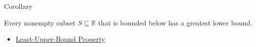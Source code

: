 \begin{corollarybox}{Corollary}
\begin{corollary}
\label{cor:glb-property-r}
Every nonempty subset $S\subseteq\mathbb{R}$ that is bounded below has a
greatest lower bound.
\end{corollary}
\end{corollarybox}

\begin{dependencies}
\begin{itemize}
  \item \hyperref[thm:lub-property-r]{Least-Upper-Bound Property}
\end{itemize}
\end{dependencies}
